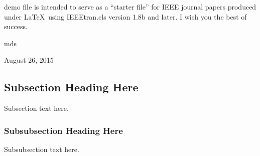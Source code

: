 \documentclass[conference]{IEEEtran}
\begin{document}
 demo file is intended to serve as a ``starter file''
for IEEE journal papers produced under \LaTeX\ using
IEEEtran.cls version 1.8b and later.
I wish you the best of success.

\hfill mds
 
\hfill August 26, 2015

\subsection{Subsection Heading Here}
Subsection text here.


\subsubsection{Subsubsection Heading Here}
Subsubsection text here.


%
%

\end{document}
